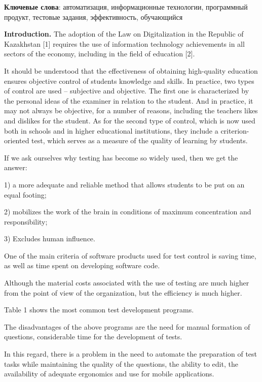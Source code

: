 {\bfseries Ключевые слова}: автоматизация, информационные технологии,
программный продукт, тестовые задания, эффективность, обучающийся

\begin{multicols}{2}

{\bfseries Introduction.} The adoption of the Law on Digitalization in the
Republic of Kazakhstan {[}1{]} requires the use of information
technology achievements in all sectors of the economy, including in the
field of education {[}2{]}.

It should be understood that the effectiveness of obtaining high-quality
education ensures objective control of students\textquotesingle{}
knowledge and skills. In practice, two types of control are used --
subjective and objective. The first one is characterized by the personal
ideas of the examiner in relation to the student. And in practice, it
may not always be objective, for a number of reasons, including the
teacher\textquotesingle s likes and dislikes for the student. As for the
second type of control, which is now used both in schools and in higher
educational institutions, they include a criterion-oriented test, which
serves as a measure of the quality of learning by students.

If we ask ourselves why testing has become so widely used, then we get
the answer:

1) a more adequate and reliable method that allows students to be put on
an equal footing;

2) mobilizes the work of the brain in conditions of maximum
concentration and responsibility;

3) Excludes human influence.

\end{multicols}
\begin{multicols}{2}

One of the main criteria of software products used for test control is
saving time, as well as time spent on developing software code.

Although the material costs associated with the use of testing are much
higher from the point of view of the organization, but the efficiency is
much higher.

Table 1 shows the most common test development programs.

The disadvantages of the above programs are the need for manual
formation of questions, considerable time for the development of tests.

In this regard, there is a problem in the need to automate the
preparation of test tasks while maintaining the quality of the
questions, the ability to edit, the availability of adequate ergonomics
and use for mobile applications.
\end{multicols}


